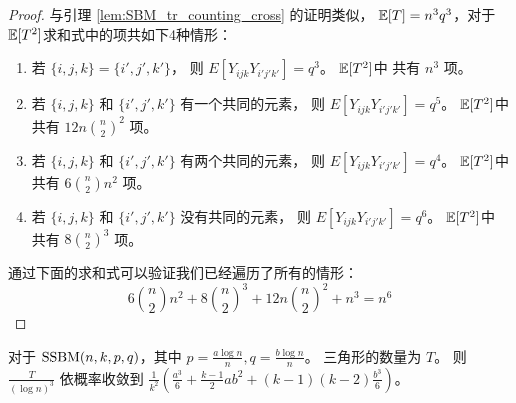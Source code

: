 \begin{proof}
	与引理 \ref{lem:SBM_tr_counting_cross} 的证明类似，
	$\operatorname{\mathbb{E}}[T] = n^3 q^3$，对于$\operatorname{\mathbb{E}}[T^2]$求和式中的项共如下4种情形：
	\begin{enumerate}
	\item 若 $\{i,j,k\} = \{i',j',k'\}$， 则 $E[Y_{ijk}Y_{i'j'k'}] = q^3$。
	$\operatorname{\mathbb{E}}[T^2]$中 共有 $n^3$ 项。
	\item 若 $\{i,j,k\}$ 和 $\{i',j',k'\}$ 有一个共同的元素， 则 $E[Y_{ijk}Y_{i'j'k'}] = q^5$。
	$\operatorname{\mathbb{E}}[T^2]$中 共有 $12n\binom{n}{2}^2$ 项。
	\item 若 $\{i,j,k\}$ 和 $\{i',j',k'\}$ 有两个共同的元素， 则 $E[Y_{ijk}Y_{i'j'k'}] = q^4$。
	$\operatorname{\mathbb{E}}[T^2]$中 共有 $6\binom{n}{2}n^2$ 项。
	\item 若 $\{i,j,k\}$ 和 $\{i',j',k'\}$ 没有共同的元素， 则  $E[Y_{ijk}Y_{i'j'k'}] = q^6$。
	$\operatorname{\mathbb{E}}[T^2]$中 共有 $8\binom{n}{2}^3$ 项。
\end{enumerate}	
通过下面的求和式可以验证我们已经遍历了所有的情形：
$$
6\binom{n}{2}n^2  + 8\binom{n}{2}^3 + 12n\binom{n}{2}^2 +  n^3 = n^6
$$
\end{proof}
\begin{lemma}\label{lem:sbmV}
 对于 $\operatorname{SSBM}(n, k, p, q)$，其中 $p=\frac{a\log n}{n}, q = \frac{b\log n}{n}$。
 三角形的数量为 $T$。
	则 $\frac{T}{(\log n)^3}$ 依概率收敛到 $\frac{1}{k^2}(\frac{a^3}{6} + \frac{k-1}{2}ab^2 + (k-1)(k-2)\frac{b^3}{6} )$。
\end{lemma}
